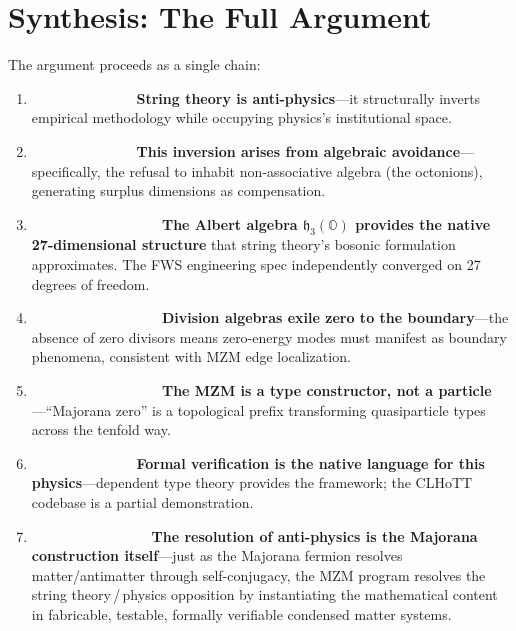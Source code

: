 \documentclass[11pt,letterpaper]{article}
\newcommand{\motivated}{\texorpdfstring{\colorbox{motivated}{\textcolor{white}{\scriptsize\textbf{\,MOTIVATED\,}}}}{ [MOTIVATED]}}
\newcommand{\conjectured}{\texorpdfstring{\colorbox{conjectured}{\textcolor{white}{\scriptsize\textbf{\,CONJECTURED\,}}}}{ [CONJECTURED]}}
\newcommand{\speculative}{\texorpdfstring{\colorbox{speculative}{\textcolor{white}{\scriptsize\textbf{\,SPECULATIVE\,}}}}{ [SPECULATIVE]}}
\newcommand{\OO}{\mathbb{O}}
\newcommand{\hthreeO}{\mathfrak{h}_3(\OO)}
\begin{document}
\section{Synthesis: The Full Argument}

The argument proceeds as a single chain:

\begin{enumerate}[label=\textbf{(\arabic*)}, leftmargin=2em, itemsep=6pt]
  \item \motivated\quad \textbf{String theory is anti-physics}---it structurally inverts empirical methodology while occupying physics's institutional space.

  \item \motivated\quad \textbf{This inversion arises from algebraic avoidance}---specifically, the refusal to inhabit non-associative algebra (the octonions), generating surplus dimensions as compensation.

  \item \conjectured\quad \textbf{The Albert algebra $\hthreeO$ provides the native 27-dimensional structure} that string theory's bosonic formulation approximates. The FWS engineering spec independently converged on 27 degrees of freedom.

  \item \conjectured\quad \textbf{Division algebras exile zero to the boundary}---the absence of zero divisors means zero-energy modes must manifest as boundary phenomena, consistent with MZM edge localization.

  \item \conjectured\quad \textbf{The MZM is a type constructor, not a particle}---``Majorana zero'' is a topological prefix transforming quasiparticle types across the tenfold way.

  \item \motivated\quad \textbf{Formal verification is the native language for this physics}---dependent type theory provides the framework; the CLHoTT codebase is a partial demonstration.

  \item \speculative\quad \textbf{The resolution of anti-physics is the Majorana construction itself}---just as the Majorana fermion resolves matter/antimatter through self-conjugacy, the MZM program resolves the string theory\,/\,physics opposition by instantiating the mathematical content in fabricable, testable, formally verifiable condensed matter systems.
\end{enumerate}
\end{document}
